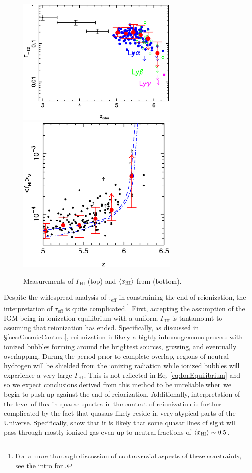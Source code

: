 \begin{figure}[!p]
  \centering
  \includegraphics[width=8cm]{Fan.gamma.eps}
  \includegraphics[width=8cm]{Fan.fHv.eps}
  \caption{Measurements of $\Gamma_{\text{HI}}$ (top) and $\langle x_{\text{HI}}\rangle$ from \cite{Fan2006a} (bottom).}
  \label{fig:tauEffResults}
\end{figure}


Despite the widespread analysis of $\tau_{\text{eff}}$ in constraining the end of reionization, the interpretation of $\tau_{\text{eff}}$ is quite complicated.\footnote{For a more thorough discussion of controversial aspects of these constraints, see the intro for \cite{McGreer:2011dm}.} First, accepting the assumption of the IGM being in ionization equilibrium with a uniform $\Gamma_{\text{HI}}$ is tantamount to assuming that reionization has ended. Specifically, as discussed in \S \ref{sec:CosmicContext}, reionization is likely a highly inhomogeneous process with ionized bubbles forming around the brightest sources, growing, and eventually overlapping. During the period prior to complete overlap, regions of neutral hydrogen will be shielded from the ionizing radiation while ionized bubbles will experience a very large $\Gamma_{\text{HI}}$. This is not reflected in Eq. \ref{eq:IonEquilibrium} and so we expect conclusions derived from this method to be unreliable when we begin to push up against the end of reionization. Additionally, interpretation of the level of flux in quasar spectra in the context of reionization is further complicated by the fact that quasars likely reside in very atypical parts of the Universe. Specifically, \cite{Lidz:2007mz} show that it is likely that some quasar lines of sight will pass through mostly ionized gas even up to neutral fractions of $\langle x_{\text{HI}}\rangle \sim 0.5$. 


